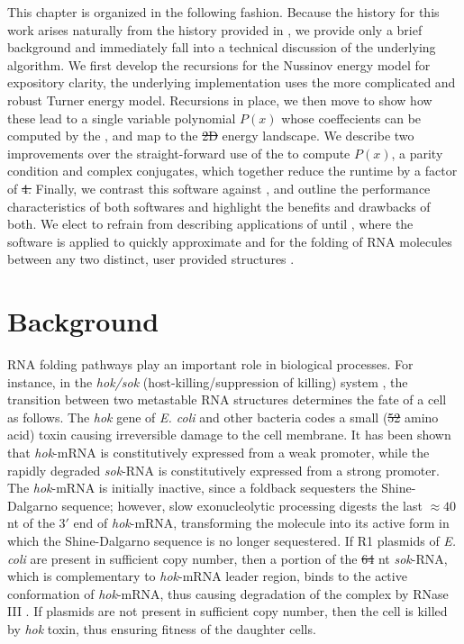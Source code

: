 \documentclass[11pt, oneside]{Thesis} %
\providecommand{\DIFadd}[1]{{\protect\color{blue}\uwave{#1}}} %
\providecommand{\DIFdel}[1]{{\protect\color{red}\sout{#1}}}                      %
\providecommand{\DIFaddbegin}{} %
\providecommand{\DIFaddend}{} %
\providecommand{\DIFdelbegin}{} %
\providecommand{\DIFdelend}{} %
\begin{document}
This chapter is organized in the following fashion. Because the history for
this work arises naturally from the history provided in
, we provide only a brief background
and immediately fall into
a technical discussion of the underlying algorithm. We first develop the
recursions for the Nussinov energy model for expository clarity, the
underlying implementation uses the more complicated and robust Turner energy
model. Recursions in place, we then move to show how these lead to
a single variable polynomial $P(x)$ whose coeffecients can be computed by
the \idft, and map to the \DIFdelbegin \DIFdel{2D }\DIFdelend \DIFaddbegin \twoD \DIFaddend energy landscape. We describe two improvements over
the straight-forward use of the \fft to compute $P(x)$,
a parity condition and complex conjugates, which together reduce the
runtime by a factor of \DIFdelbegin \DIFdel{4. }\DIFdelend \DIFaddbegin \DIFadd{$4$. }\DIFaddend Finally, we contrast this software against \rnatwofold,
and outline the performance characteristics of both softwares and highlight
the benefits and drawbacks of both. We elect to refrain from describing
applications of \ffttwo until , where the software is
applied to quickly approximate \mfpt and \eqt for the folding of RNA molecules
between any two distinct, user provided structures \strAB.

\section{Background}
\label{sec:ffttwo:bkgrnd}

RNA folding pathways play an important role in biological processes.
For instance, in the {\em hok/sok}
(host-killing/suppression of killing) system \citep{gerdes.arg97},
the transition between two metastable RNA structures determines the
fate of a cell as follows.
The {\em hok} gene of {\em E. coli} and other bacteria
codes a small (\DIFdelbegin \DIFdel{52 }\DIFdelend \DIFaddbegin \DIFadd{$52$ }\DIFaddend amino acid) toxin causing irreversible damage to the cell
membrane. It has been shown that {\em hok}-mRNA is
constitutively expressed from a weak promoter, while
the rapidly degraded {\em sok}-RNA is constitutively expressed from
a strong promoter.  The {\em hok}-mRNA is initially
inactive, since a foldback sequesters the
Shine-Dalgarno sequence; however, slow exonucleolytic processing
digests the last $\approx 40$ nt of the $3'$ end of {\em hok}-mRNA,
transforming the molecule into its active form in which
the Shine-Dalgarno sequence is no longer sequestered.
If R1 plasmids of {\em E. coli} are present in
sufficient copy number, then a portion of the \DIFdelbegin \DIFdel{64 }\DIFdelend \DIFaddbegin \DIFadd{$64$ }\DIFaddend nt
{\em sok}-RNA, which is complementary to {\em hok}-mRNA leader
region, binds to the active conformation of {\em hok}-mRNA, thus
causing degradation of the complex by RNase III \citep{gerdes.arg97}.
If plasmids are not present in sufficient copy number, then the
cell is killed by {\em hok} toxin, thus ensuring fitness of the daughter
cells.
\end{document}
